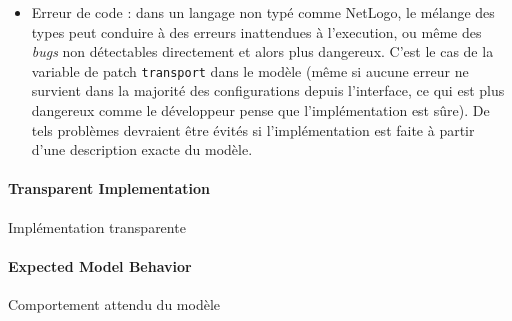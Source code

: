 {\begin{itemize}
\item Erreur de code : dans un langage non typé comme NetLogo, le mélange des types peut conduire à des erreurs inattendues à l'execution, ou même des \emph{bugs} non détectables directement et alors plus dangereux. C'est le cas de la variable de patch \texttt{transport} dans le modèle (même si aucune erreur ne survient dans la majorité des configurations depuis l'interface, ce qui est plus dangereux comme le développeur pense que l'implémentation est sûre). De tels problèmes devraient être évités si l'implémentation est faite à partir d'une description exacte du modèle.
\end{itemize}
}



\paragraph{Transparent Implementation}{Implémentation transparente}



\paragraph{Expected Model Behavior}{Comportement attendu du modèle}


